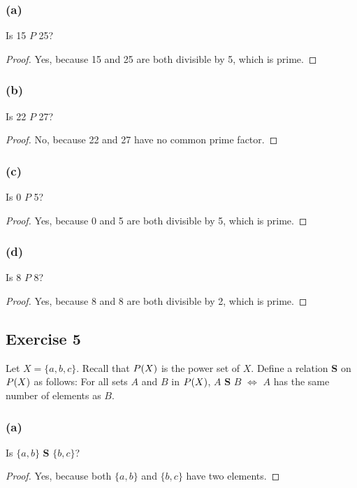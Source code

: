 \documentclass[14pt]{extarticle}
\let\mathscr\relax
\newcommand{\ps}{\mathscr{P}} %
\begin{document}
\subsubsection{(a)}
Is 15 $P$ 25?

\begin{proof}
Yes, because 15 and 25 are both divisible by 5, which is prime.
\end{proof}

\subsubsection{(b)}
Is 22 $P$ 27?

\begin{proof}
No, because 22 and 27 have no common prime factor.
\end{proof}

\subsubsection{(c)}
Is 0 $P$ 5?

\begin{proof}
Yes, because 0 and 5 are both divisible by 5, which is prime.
\end{proof}

\subsubsection{(d)}
Is 8 $P$ 8?

\begin{proof}
Yes, because 8 and 8 are both divisible by 2, which is prime.
\end{proof}

\subsection{Exercise 5}
Let \(X = \{a, b, c\}\). Recall that \(\ps(X)\) is the power set of $X$. Define a relation {\bf S} on \(\ps(X)\) 
as follows: For all sets $A$ and $B$ in \(\ps(X)\), $A$ {\bf S} $B$ $\iff$ $A$ has the same number of elements as $B$.

\subsubsection{(a)}
Is \(\{a, b\}\) {\bf S} \(\{b, c\}\)?

\begin{proof}
Yes, because both \(\{a, b\}\) and \(\{b, c\}\) have two elements.
\end{proof}
\end{document}
